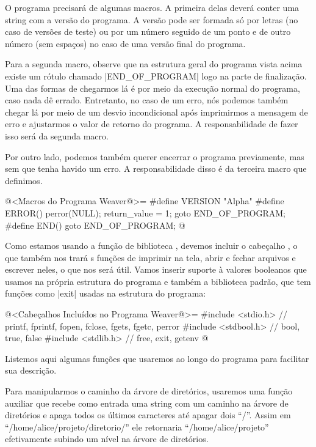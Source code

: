 
O programa precisará de algumas macros. A primeira delas deverá conter
uma string com a versão do programa. A versão pode ser formada só por
letras (no caso de versões de teste) ou por um número seguido de um
ponto e de outro número (sem espaços) no caso de uma versão final do
programa.

Para a segunda macro, observe que na estrutura geral do programa vista
acima existe um rótulo chamado |END_OF_PROGRAM| logo na parte de
finalização. Uma das formas de chegarmos lá é por meio da execução
normal do programa, caso nada dê errado. Entretanto, no caso de um
erro, nós podemos também chegar lá por meio de um desvio incondicional
após imprimirmos a mensagem de erro e ajustarmos o valor de retorno do
programa. A responsabilidade de fazer isso será da segunda macro.

Por outro lado, podemos também querer encerrar o programa previamente,
mas sem que tenha havido um erro. A responsabilidade disso é da
terceira macro que definimos.

\iniciocodigo
@<Macros do Programa Weaver@>=
#define VERSION "Alpha"
#define ERROR() {perror(NULL); return_value = 1; goto END_OF_PROGRAM;}
#define END() goto END_OF_PROGRAM;
@
\fimcodigo

Como estamos usando a função de biblioteca ,
devemos incluir o cabeçalho , o que também nos
trará s funções de imprimir na tela, abrir e fechar arquivos e
escrever neles, o que nos será útil. Vamos inserir suporte à valores
booleanos que usamos na própria estrutura do programa e também a
biblioteca padrão, que tem funções como |exit| usadas na estrutura do
programa:

\iniciocodigo
@<Cabeçalhos Incluídos no Programa Weaver@>=
#include <stdio.h> // printf, fprintf, fopen, fclose, fgets, fgetc, perror
#include <stdbool.h> // bool, true, false
#include <stdlib.h> // free, exit, getenv
@
\fimcodigo


Listemos aqui algumas funções que usaremos ao longo do programa para
facilitar sua descrição.


Para manipularmos o caminho da árvore de diretórios, usaremos uma
função auxiliar que recebe como entrada uma string com um caminho na
árvore de diretórios e apaga todos os últimos caracteres até apagar
dois ``/''. Assim em ``/home/alice/projeto/diretorio/'' ele retornaria
``/home/alice/projeto'' efetivamente subindo um nível na árvore de
diretórios.


